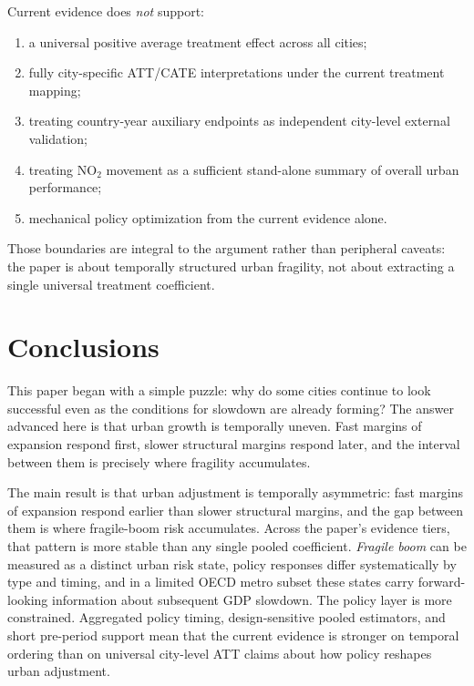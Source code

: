 \documentclass[11pt,a4paper]{article}
\begin{document}
Current evidence does \emph{not} support:
\begin{enumerate}
  \item a universal positive average treatment effect across all cities;
  \item fully city-specific ATT/CATE interpretations under the current treatment mapping;
  \item treating country-year auxiliary endpoints as independent city-level external validation;
  \item treating NO$_2$ movement as a sufficient stand-alone summary of overall urban performance;
  \item mechanical policy optimization from the current evidence alone.
\end{enumerate}
Those boundaries are integral to the argument rather than peripheral caveats: the paper is about temporally structured urban fragility, not about extracting a single universal treatment coefficient.


\section{Conclusions}

This paper began with a simple puzzle: why do some cities continue to look successful even as the conditions for slowdown are already forming?
The answer advanced here is that urban growth is temporally uneven.
Fast margins of expansion respond first, slower structural margins respond later, and the interval between them is precisely where fragility accumulates.

The main result is that urban adjustment is temporally asymmetric: fast margins of expansion respond earlier than slower structural margins, and the gap between them is where fragile-boom risk accumulates.
Across the paper's evidence tiers, that pattern is more stable than any single pooled coefficient.
\emph{Fragile boom} can be measured as a distinct urban risk state, policy responses differ systematically by type and timing, and in a limited OECD metro subset these states carry forward-looking information about subsequent GDP slowdown.
The policy layer is more constrained.
Aggregated policy timing, design-sensitive pooled estimators, and short pre-period support mean that the current evidence is stronger on temporal ordering than on universal city-level ATT claims about how policy reshapes urban adjustment.
\end{document}
